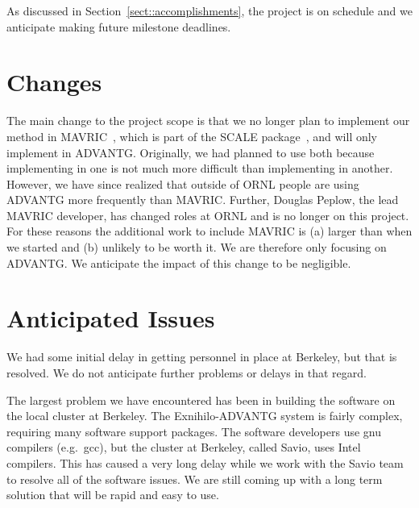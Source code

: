 \documentclass[12pt]{article}
\begin{document}
As discussed in Section~\ref{sect::accomplishments}, the project is on schedule and we anticipate making future milestone deadlines.


\section{Changes}
\label{sect::changes}

The main change to the project scope is that we no longer plan to implement our method in MAVRIC~\cite{peplow_mavric_2011}, which is part of the SCALE package~\cite{SCALE}, and will only implement in ADVANTG. Originally, we had planned to use both because implementing in one is not much more difficult than implementing in another. However, we have since realized that outside of ORNL people are using ADVANTG more frequently than MAVRIC. Further, Douglas Peplow, the lead MAVRIC developer, has changed roles at ORNL and is no longer on this project. For these reasons the additional work to include MAVRIC is (a) larger than when we started and (b) unlikely to be worth it. We are therefore only focusing on ADVANTG. We anticipate the impact of this change to be negligible.


\section{Anticipated Issues}
\label{sect::issues}

We had some initial delay in getting personnel in place at Berkeley, but that is resolved. We do not anticipate further problems or delays in that regard.

The largest problem we have encountered has been in building the software on the local cluster at Berkeley. The Exnihilo-ADVANTG system is fairly complex, requiring many software support packages. The software developers use gnu compilers (e.g.\ gcc), but the cluster at Berkeley, called Savio, uses Intel compilers. This has caused a very long delay while we work with the Savio team to resolve all of the software issues. We are still coming up with a long term solution that will be rapid and easy to use.
\end{document}
